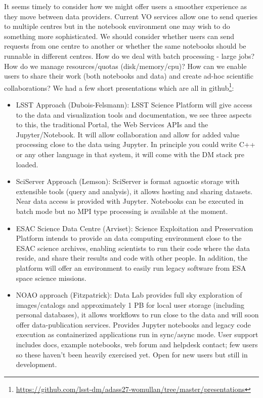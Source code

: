 \documentclass[11pt,twoside]{article}
\begin{document}
It seems timely to consider how we might offer users a smoother experience as they move between data providers.
Current VO services allow one to send queries to multiple centres but in the notebook environment one may wish to do something more sophisticated. We should consider whether users can send requests from one centre to another or whether the same notebooks should be runnable in different centres.
How do we deal with batch processing - large jobs? How do we manage resources/quotas (disk/memory/cpu)?  How can we enable users to share their work (both notebooks and data) and create ad-hoc scientific collaborations?
We had a few short presentations which are all in github\footnote{\url{https://github.com/lsst-dm/adass27-womullan/tree/master/presentations}}:
\begin{itemize}
\item LSST Approach (Dubois-Felsmann): LSST\citep{2008arXiv0805.2366I} Science Platform\citep{LSE-319} will give access to the data and visualization tools and documentation, we see three aspects to this, the traditional Portal, the Web Services APIs and the Jupyter/Notebook.
It will allow collaboration and allow for added value processing close to the data using Jupyter. In principle you could write C++ or any other language in that system, it will come with the DM stack pre loaded.

\item SciServer Approach (Lemson): SciServer is format agnostic storage with extensible tools (query and analysis), it allows hosting and sharing datasets. Near data access is provided with Jupyter. Notebooks can be executed in batch mode but no MPI type processing is available at the moment.

\item ESAC Science Data Centre (Arviset): Science Exploitation and Preservation Platform intends to provide an data computing environment close to the ESAC science archives, enabling scientists to run their code where the data reside, and share their results and code with other people. In addition, the platform will offer an environment to easily run legacy software from ESA space science missions.



\item NOAO approach (Fitzpatrick): Data Lab provides full sky exploration of images/catalogs and approximately 1 PB for local user storage (including personal databases), it allows workflows to run close to the data and will soon offer data-publication services. Provides Jupyter notebooks and legacy code execution as containerized applications run in sync/async mode. User support includes docs, example notebooks, web forum and helpdesk contact; few users so these haven't been heavily exercised yet.  Open for new users but still in development.



\end{itemize}
\end{document}
